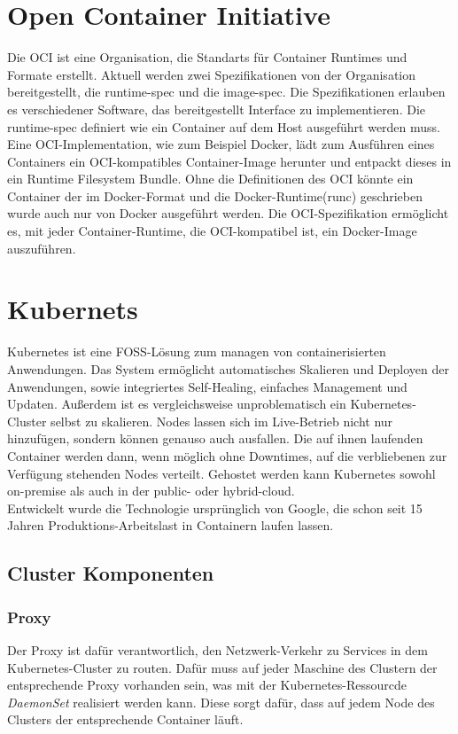 \section{Open Container Initiative}
Die \ac{OCI} ist eine Organisation, die Standarts für Container Runtimes und Formate erstellt.
Aktuell werden zwei Spezifikationen von der Organisation bereitgestellt, die \ac{runtime-spec} und die \ac{image-spec}.
Die Spezifikationen erlauben es verschiedener Software, das bereitgestellt Interface zu implementieren.
Die \ac{runtime-spec} definiert wie ein Container auf dem Host ausgeführt werden muss. 
Eine \ac{OCI}-Implementation, wie zum Beispiel Docker, lädt zum Ausführen eines Containers ein \ac{OCI}-kompatibles Container-Image herunter und entpackt dieses in ein Runtime Filesystem Bundle.
Ohne die Definitionen des \ac{OCI} könnte ein Container der im Docker-Format und die Docker-Runtime(runc) geschrieben wurde auch nur von Docker ausgeführt werden.
Die \ac{OCI}-Spezifikation ermöglicht es, mit jeder Container-Runtime, die \ac{OCI}-kompatibel ist, ein Docker-Image auszuführen. \cite{oci}



\section{Kubernets}
Kubernetes ist eine \ac{FOSS}-Lösung zum managen von containerisierten Anwendungen.
Das System ermöglicht automatisches Skalieren und Deployen der Anwendungen, sowie integriertes Self-Healing, einfaches Management und Updaten.
Außerdem ist es vergleichsweise unproblematisch ein Kubernetes-Cluster selbst zu skalieren. 
Nodes lassen sich im Live-Betrieb nicht nur hinzufügen, sondern können genauso auch ausfallen. 
Die auf ihnen laufenden Container werden dann, wenn möglich ohne Downtimes, auf die verbliebenen zur Verfügung stehenden Nodes verteilt. 
Gehostet werden kann Kubernetes sowohl on-premise als auch in der public- oder hybrid-cloud.
\\
Entwickelt wurde die Technologie ursprünglich von Google, die schon seit 15 Jahren Produktions-Arbeitslast in Containern laufen lassen.
\cite{kubernetes}

\subsection{Cluster Komponenten}
\subsubsection{Proxy}
Der Proxy ist dafür verantwortlich, den Netzwerk-Verkehr zu Services in dem Kubernetes-Cluster zu routen. 
Dafür muss auf jeder Maschine des Clustern der entsprechende Proxy vorhanden sein, was mit der Kubernetes-Ressourcde \textit{DaemonSet} realisiert werden kann.
Diese sorgt dafür, dass auf jedem Node des Clusters der entsprechende Container läuft.\cite[S.34]{Kubernetes_up_and_running}
